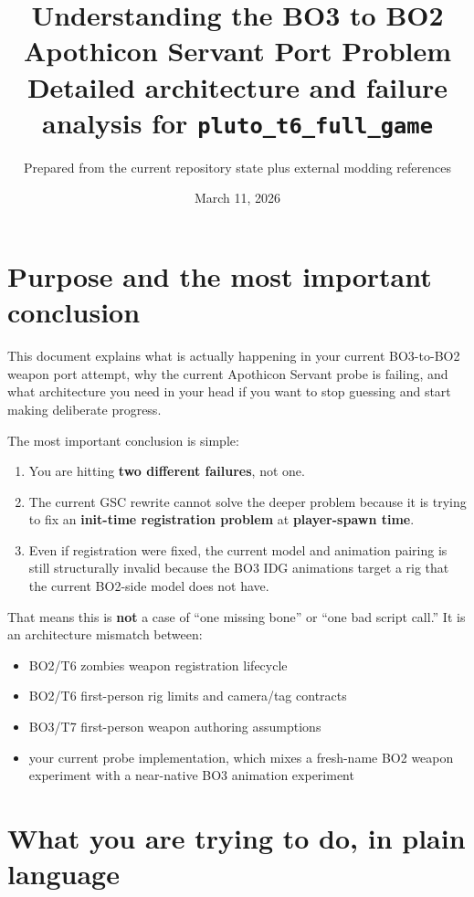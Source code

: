 \documentclass[11pt]{article}
\title{Understanding the BO3 to BO2 Apothicon Servant Port Problem\\\large Detailed architecture and failure analysis for \texttt{pluto\_t6\_full\_game}}
\author{Prepared from the current repository state plus external modding references}
\date{March 11, 2026}
\begin{document}
\maketitle
\tableofcontents
\newpage

\section{Purpose and the most important conclusion}

This document explains what is actually happening in your current BO3-to-BO2 weapon port attempt, why the current Apothicon Servant probe is failing, and what architecture you need in your head if you want to stop guessing and start making deliberate progress.

The most important conclusion is simple:

\begin{enumerate}
  \item You are hitting \textbf{two different failures}, not one.
  \item The current GSC rewrite cannot solve the deeper problem because it is trying to fix an \textbf{init-time registration problem} at \textbf{player-spawn time}.
  \item Even if registration were fixed, the current model and animation pairing is still structurally invalid because the BO3 IDG animations target a rig that the current BO2-side model does not have.
\end{enumerate}

That means this is \textbf{not} a case of ``one missing bone'' or ``one bad script call.'' It is an architecture mismatch between:

\begin{itemize}
  \item BO2/T6 zombies weapon registration lifecycle
  \item BO2/T6 first-person rig limits and camera/tag contracts
  \item BO3/T7 first-person weapon authoring assumptions
  \item your current probe implementation, which mixes a fresh-name BO2 weapon experiment with a near-native BO3 animation experiment
\end{itemize}

\section{What you are trying to do, in plain language}
\end{document}
